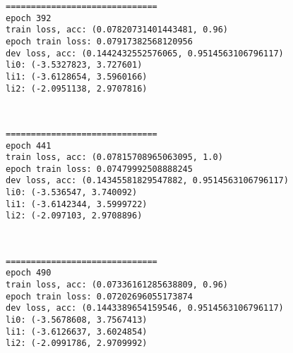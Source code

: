 \documentclass[11pt]{article}
\begin{document}
    \begin{Verbatim}[commandchars=\\\{\}]
==============================
epoch 392
train loss, acc: (0.07820731401443481, 0.96)
epoch train loss: 0.07917382568120956
dev loss, acc: (0.1442432552576065, 0.9514563106796117)
li0: (-3.5327823, 3.727601)
li1: (-3.6128654, 3.5960166)
li2: (-2.0951138, 2.9707816)

    \end{Verbatim}

    \begin{center}
    \end{center}
    { \hspace*{\fill} \\}
    
    \begin{Verbatim}[commandchars=\\\{\}]
==============================
epoch 441
train loss, acc: (0.07815708965063095, 1.0)
epoch train loss: 0.07479992508888245
dev loss, acc: (0.14345581829547882, 0.9514563106796117)
li0: (-3.536547, 3.740092)
li1: (-3.6142344, 3.5999722)
li2: (-2.097103, 2.9708896)

    \end{Verbatim}

    \begin{center}
    \end{center}
    { \hspace*{\fill} \\}
    
    \begin{Verbatim}[commandchars=\\\{\}]
==============================
epoch 490
train loss, acc: (0.07336161285638809, 0.96)
epoch train loss: 0.07202696055173874
dev loss, acc: (0.1443389654159546, 0.9514563106796117)
li0: (-3.5678608, 3.7567413)
li1: (-3.6126637, 3.6024854)
li2: (-2.0991786, 2.9709992)

    \end{Verbatim}

    \begin{center}
    \end{center}
    { \hspace*{\fill} \\}
    
\end{document}
